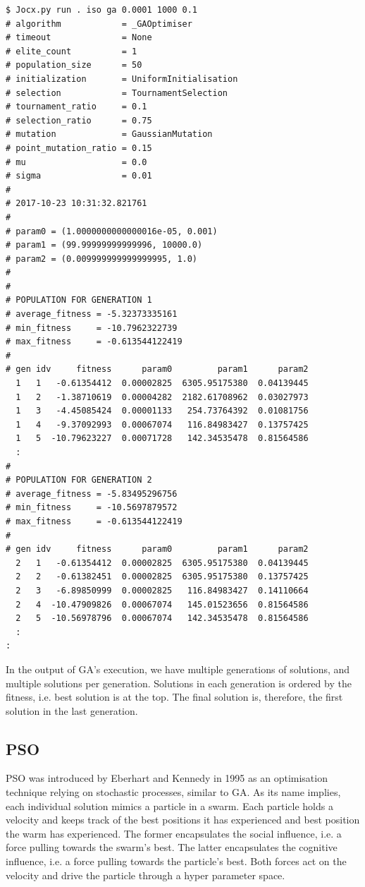 \documentclass[graybox]{svmult}
\begin{document}
 {\scriptsize{}\begin{verbatim}
$ Jocx.py run . iso ga 0.0001 1000 0.1
# algorithm            = _GAOptimiser
# timeout              = None
# elite_count          = 1
# population_size      = 50
# initialization       = UniformInitialisation
# selection            = TournamentSelection
# tournament_ratio     = 0.1
# selection_ratio      = 0.75
# mutation             = GaussianMutation
# point_mutation_ratio = 0.15
# mu                   = 0.0
# sigma                = 0.01
#
# 2017-10-23 10:31:32.821761
#
# param0 = (1.0000000000000016e-05, 0.001)
# param1 = (99.99999999999996, 10000.0)
# param2 = (0.009999999999999995, 1.0)
#
#
# POPULATION FOR GENERATION 1
# average_fitness = -5.32373335161
# min_fitness     = -10.7962322739
# max_fitness     = -0.613544122419
#
# gen idv     fitness      param0         param1      param2
  1   1   -0.61354412  0.00002825  6305.95175380  0.04139445
  1   2   -1.38710619  0.00004282  2182.61708962  0.03027973
  1   3   -4.45085424  0.00001133   254.73764392  0.01081756
  1   4   -9.37092993  0.00067074   116.84983427  0.13757425
  1   5  -10.79623227  0.00071728   142.34535478  0.81564586
  :
#
# POPULATION FOR GENERATION 2
# average_fitness = -5.83495296756
# min_fitness     = -10.5697879572
# max_fitness     = -0.613544122419
#
# gen idv     fitness      param0         param1      param2
  2   1   -0.61354412  0.00002825  6305.95175380  0.04139445
  2   2   -0.61382451  0.00002825  6305.95175380  0.13757425
  2   3   -6.89850999  0.00002825   116.84983427  0.14110664
  2   4  -10.47909826  0.00067074   145.01523656  0.81564586
  2   5  -10.56978796  0.00067074   142.34535478  0.81564586
  :
:
\end{verbatim}}

In the output of GA's execution, we have multiple generations of solutions, and multiple solutions per generation. Solutions in each generation is ordered by the fitness, i.e. best solution is at the top. The final solution is, therefore, the first solution in the last generation.

\subsection{PSO}

PSO was introduced by Eberhart and Kennedy in 1995 \cite{eberhart1995new} as an optimisation technique relying on stochastic processes, similar to GA. As its name implies, each individual solution mimics a particle in a swarm. Each particle holds a velocity and keeps track of the best positions it has experienced and best position the warm has experienced. The former encapsulates the social influence, i.e. a force pulling towards the swarm's best. The latter encapsulates the cognitive influence, i.e. a force pulling towards the particle's best. Both forces act on the velocity and drive the particle through a hyper parameter space.
\end{document}
